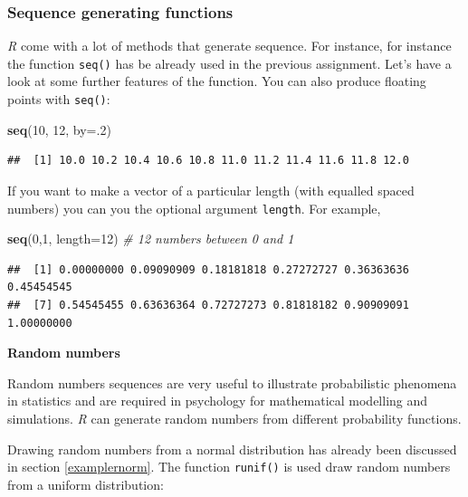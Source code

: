 \documentclass[
]{scrartcl}
\newenvironment{Shaded}{\begin{snugshade}}{\end{snugshade}}
\newcommand{\AttributeTok}[1]{\textcolor[rgb]{0.13,0.29,0.53}{#1}}
\newcommand{\CommentTok}[1]{\textcolor[rgb]{0.56,0.35,0.01}{\textit{#1}}}
\newcommand{\DecValTok}[1]{\textcolor[rgb]{0.00,0.00,0.81}{#1}}
\newcommand{\FunctionTok}[1]{\textcolor[rgb]{0.13,0.29,0.53}{\textbf{#1}}}
\newcommand{\NormalTok}[1]{#1}
\begin{document}
\subsubsection{Sequence generating functions}\label{sequence-generating-functions}

\emph{R} come with a lot of methods that generate sequence. For instance, for instance the function \texttt{seq()} has be already used in the previous assignment. Let's have a look at some further features of the function. You can also produce floating points with \texttt{seq()}:

\begin{Shaded}
\begin{Highlighting}[]
\FunctionTok{seq}\NormalTok{(}\DecValTok{10}\NormalTok{, }\DecValTok{12}\NormalTok{, }\AttributeTok{by=}\NormalTok{.}\DecValTok{2}\NormalTok{)}
\end{Highlighting}
\end{Shaded}

\begin{verbatim}
##  [1] 10.0 10.2 10.4 10.6 10.8 11.0 11.2 11.4 11.6 11.8 12.0
\end{verbatim}

If you want to make a vector of a particular length (with equalled spaced numbers) you can you the optional argument \texttt{length}. For example,

\begin{Shaded}
\begin{Highlighting}[]
\FunctionTok{seq}\NormalTok{(}\DecValTok{0}\NormalTok{,}\DecValTok{1}\NormalTok{, }\AttributeTok{length=}\DecValTok{12}\NormalTok{) }\CommentTok{\# 12 numbers between 0  and 1}
\end{Highlighting}
\end{Shaded}

\begin{verbatim}
##  [1] 0.00000000 0.09090909 0.18181818 0.27272727 0.36363636 0.45454545
##  [7] 0.54545455 0.63636364 0.72727273 0.81818182 0.90909091 1.00000000
\end{verbatim}

\textbf{Random numbers}

Random numbers sequences are very useful to illustrate probabilistic phenomena in statistics and are required in psychology for mathematical modelling and simulations. \emph{R} can generate random numbers from different probability functions.

Drawing random numbers from a normal distribution has already been discussed in section \ref{examplernorm}. The function \texttt{runif()} is used draw random numbers from a uniform distribution:
\end{document}
